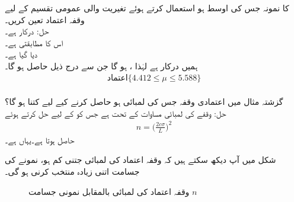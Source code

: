   کا نمونہ جس کی اوسط  ہو استعمال کرتے ہوئے تغیریت  والی عمومی تقسیم کے لیے  وقفہ اعتماد تعین کریں۔\\
حل:\quad {} \quad
{} درکار ہے۔\\ 
 \quad
اس کا مطابقتی  ہے۔\\
 \quad
{} دیا گیا ہے۔\\
\quad
ہمیں  درکار ہے لہٰذا ،  ہو گا جن سے درج ذیل حاصل ہو گا۔
\begin{align*}
\text{اعتماد} \{ 4.412\le \mu \le 5.588\}
\end{align*}
\quad {}\\
گزشتہ مثال میں  اعتمادی وقفہ جس کی لمبائی  ہو حاصل کرنے کیے لیے  کتنا ہو گا؟\\
حل:\quad
وقفے کی لمبائی مساوات  کے تحت  ہے جس کو  کے لیے حل کرتے ہوئے  
\begin{align*}
n=\big(\frac{2c\sigma}{L}\big)^2
\end{align*}
حاصل ہوتا ہے۔یہاں  ہے۔

شکل  میں آپ دیکھ سکتے ہیں کہ وقفہ اعتماد کی لمبائی  جتنی کم ہو، نمونے کی جسامت  اتنی زیادہ منتخب کرنی ہو گی۔
\begin{figure}
\centering
{}
\caption{وقفہ اعتماد کی لمبائی  بالمقابل نمونی جسامت $n$}
\label{شکل_شماریات_وقفہ_لمبائی_بالمقابل_جسامت}
\end{figure}

